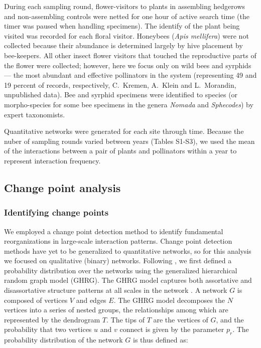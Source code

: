 \documentclass[12pt]{article}
\begin{document}
During each sampling round, flower-visitors to plants in assembling
hedgerows and non-assembling controls were netted for one hour of
active search time (the timer was paused when handling specimens). The
identify of the plant being visited was recorded for each floral
visitor. Honeybees (\textit{Apis mellifera}) were not collected
because their abundance is determined largely by hive placement by
bee-keepers. All other insect flower visitors that touched the
reproductive parts of the flower were collected; however, here we
focus only on wild bees and syrphids --- the most abundant and
effective pollinators in the system (representing 49 and 19 percent of
records, respectively, C.~Kremen, A.~Klein and L.~Morandin,
unpublished data). Bee and syrphid specimens were identified to
species (or morpho-species for some bee specimens in the genera
\textit{Nomada} and \textit{Sphecodes}) by expert taxonomists.

Quantitative networks were generated for each site through
time. Because the nuber of sampling rounds varied between years
(Tables S1-S3), we used the mean of the interactions between a pair of
plants and pollinators within a year to represent interaction
frequency.

\subsection*{Change point analysis}
\subsubsection*{Identifying change points}
We employed a change point detection method \citep{peel2014detecting}
to identify fundamental reorganizations in large-scale interaction
patterns. Change point detection methods have yet to be generalized to
quantitative networks, so for this analysis we focused on qualitative
(binary) networks. Following \cite{peel2014detecting}, we first
defined a probability distribution over the networks using the
generalized hierarchical random graph model (GHRG). The GHRG model
captures both assortative and disassortative structure patterns at all
scales in the network \citep{peel2014detecting}. A network $G$ is
composed of vertices $V$ and edges $E$. The GHRG model decomposes the
$N$ vertices into a series of nested groups, the relationships among
which are represented by the dendrogram $T$. The tips of $T$ are the
vertices of $G$, and the probability that two vertices $u$ and $v$
connect is given by the parameter $p_r$. The probability distribution
of the network $G$ is thus defined as:
\end{document}

